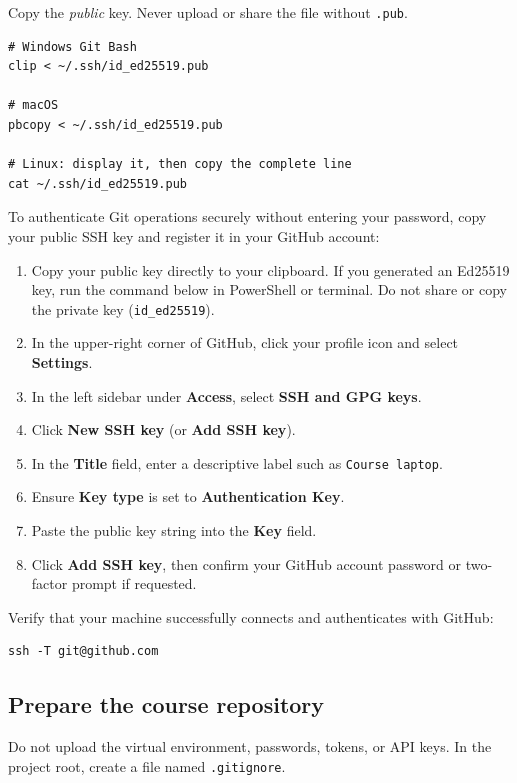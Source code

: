 Copy the \emph{public} key. Never upload or share the file without
\texttt{.pub}.

\begin{lstlisting}[style=utpterminal]
# Windows Git Bash
clip < ~/.ssh/id_ed25519.pub

# macOS
pbcopy < ~/.ssh/id_ed25519.pub

# Linux: display it, then copy the complete line
cat ~/.ssh/id_ed25519.pub
\end{lstlisting}

\noindent To authenticate Git operations securely without entering your password, copy your public SSH key and register it in your GitHub account:

\begin{enumerate}[leftmargin=1.7em]
  \item Copy your public key directly to your clipboard. If you generated an Ed25519 key, run the command below in PowerShell or terminal. Do not share or copy the private key (\texttt{id\_ed25519}).
  \item In the upper-right corner of GitHub, click your profile icon and select \textbf{Settings}.
  \item In the left sidebar under \textbf{Access}, select \textbf{SSH and GPG keys}.
  \item Click \textbf{New SSH key} (or \textbf{Add SSH key}).
  \item In the \textbf{Title} field, enter a descriptive label such as \texttt{Course laptop}.
  \item Ensure \textbf{Key type} is set to \textbf{Authentication Key}.
  \item Paste the public key string into the \textbf{Key} field.
  \item Click \textbf{Add SSH key}, then confirm your GitHub account password or two-factor prompt if requested.
\end{enumerate}

\noindent Verify that your machine successfully connects and authenticates with GitHub:

\begin{lstlisting}[style=utpterminal]
ssh -T git@github.com
\end{lstlisting}

\subsection{Prepare the course repository}

Do not upload the virtual environment, passwords, tokens, or API keys. In the project root, create a file named \texttt{.gitignore}.

